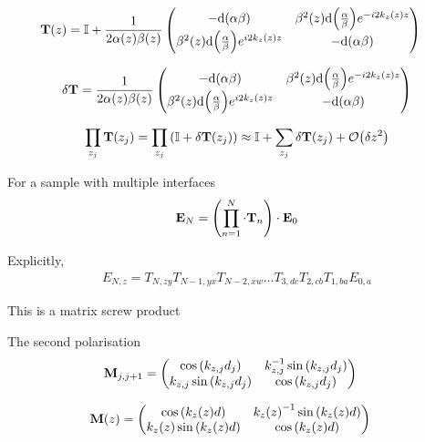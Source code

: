 \begin{align*}
	\vb{T}\pqty{z} &= \mathbb{I} + \frac{1}{2\alpha\pqty{z}\beta\pqty{z}}\pmqty{
		- \dd\pqty{\alpha\beta} &
		\beta^2\pqty{z}\dd\pqty{\frac{\alpha}{\beta}}e^{-i2k_{z}\pqty{z}z} \\
		\beta^2\pqty{z}\dd\pqty{\frac{\alpha}{\beta}}e^{i2k_{z}\pqty{z}z} &
		- \dd\pqty{\alpha\beta}
		}
\end{align*}

\begin{align*}
	\delta \vb{T} = \frac{1}{2\alpha\pqty{z}\beta\pqty{z}}\pmqty{
		- \dd\pqty{\alpha\beta} &
		\beta^2\pqty{z}\dd\pqty{\frac{\alpha}{\beta}}e^{-i2k_{z}\pqty{z}z} \\
		\beta^2\pqty{z}\dd\pqty{\frac{\alpha}{\beta}}e^{i2k_{z}\pqty{z}z} &
		- \dd\pqty{\alpha\beta}
		}
\end{align*}

\begin{align*}
	\prod_{z_j }\vb{T}\pqty{z_j} = \prod_{z_j} \pqty{\mathbb{I} + \delta\vb{T}\pqty{z_j}} \approx \mathbb{I} + \sum_{z_j}\delta\vb{T}\pqty{z_j} + \mathcal{O}\pqty{\delta z^2}
\end{align*}



For a sample with multiple interfaces
\begin{align*}
	\vb{E}_N = \pqty{\prod_{n=1}^N\cdot \vb{T}_{n}} \cdot \vb{E}_0
\end{align*}

Explicitly,
\begin{align*}
	E_{N,z} = T_{N,zy}T_{N-1,yx}T_{N-2,xw}\ldots T_{3,dc}T_{2,cb} T_{1,ba} E_{0,a}
\end{align*}

This is a matrix screw product

The second polarisation
\begin{align*}
	\vb{M}_{j,j+1} 
		&= \pmqty{
		\cos\pqty{k_{z,j}d_j} & 
		k_{z,j}^{-1}\sin\pqty{k_{z,j}d_j} \\
		k_{z,j}\sin\pqty{k_{z,j}d_j} &
		\cos\pqty{k_{z,j}d_j}
		}
\end{align*}

\begin{align*}
	\vb{M}\pqty{z}
		&= \pmqty{
		\cos\pqty{k_{z}\pqty{z}d} & 
		k_{z}\pqty{z}^{-1}\sin\pqty{k_{z}\pqty{z}d} \\
		k_{z}\pqty{z}\sin\pqty{k_{z}\pqty{z}d} &
		\cos\pqty{k_{z}\pqty{z}d}
		}
\end{align*}

